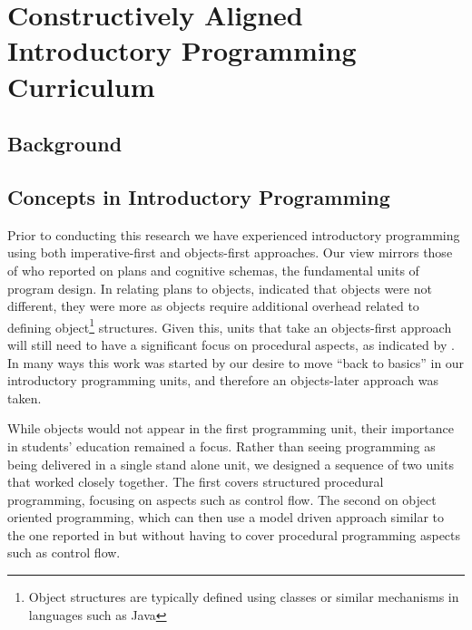 
\chapter{Constructively Aligned Introductory Programming Curriculum} %
\label{cha:constructively_aligned_introductory_programming_curriculum}


\section{Background} %
\label{sec:background}



\section{Concepts in Introductory Programming} %
\label{sec:concepts_in_introductory_programming}

Prior to conducting this research we have experienced introductory programming using both imperative-first and objects-first approaches. Our view mirrors those of \citet{Rist:1996} who reported on plans and cognitive schemas, the fundamental units of program design. In relating plans to objects, \citet{Rist:1996} indicated that objects were not different, they were more as objects require additional overhead related to defining object\footnote{Object structures are typically defined using classes or similar mechanisms in languages such as Java} structures. Given this, units that take an objects-first approach will still need to have a significant focus on procedural aspects, as indicated by \citet{Robins:2003}. In many ways this work was started by our desire to move ``back to basics'' \cite{Reges:2006} in our introductory programming units, and therefore an objects-later approach was taken.

While objects would not appear in the first programming unit, their importance in students' education remained a focus. Rather than seeing programming as being delivered in a single stand alone unit, we designed a sequence of two units that worked closely together. The first covers structured procedural programming, focusing on aspects such as control flow. The second on object oriented programming, which can then use a model driven approach similar to the one reported in \citet{Bennedsen:2004} but without having to cover procedural programming aspects such as control flow.

